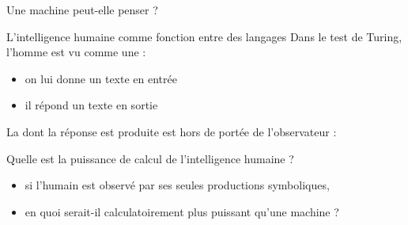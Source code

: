 
\begingroup

\begin{frame}{Une machine peut-elle penser ?}
  
  \begin{block}{L'intelligence humaine comme fonction entre des langages}
    Dans le test de Turing, l'homme est vu comme une  : 
    \begin{itemize}
    \item on lui donne un texte en entrée
    \item il répond un texte en sortie
    \end{itemize}
    La  dont la réponse est produite est hors de portée de l'observateur :
  \end{block}

  \vspace{-5mm}
  \begin{block}{Quelle est la puissance de calcul de l'intelligence humaine ?}
    \begin{itemize}
    \item si l'humain est observé par ses seules productions symboliques,
    \item en quoi serait-il calculatoirement plus puissant qu'une machine ?
    \end{itemize}
  \end{block}

\end{frame}

\endgroup
\endinput
